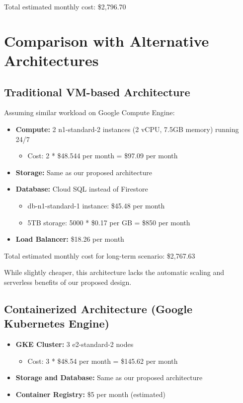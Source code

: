 \documentclass[a4paper, 12pt]{report}
\begin{document}
Total estimated monthly cost: \$2,796.70

\section{Comparison with Alternative Architectures}

\subsection{Traditional VM-based Architecture}

Assuming similar workload on Google Compute Engine:

\begin{itemize}
    \item \textbf{Compute:} 2 n1-standard-2 instances (2 vCPU, 7.5GB memory) running 24/7
        \begin{itemize}
            \item Cost: 2 * \$48.544 per month = \$97.09 per month
        \end{itemize}
    \item \textbf{Storage:} Same as our proposed architecture
    \item \textbf{Database:} Cloud SQL instead of Firestore
        \begin{itemize}
            \item db-n1-standard-1 instance: \$45.48 per month
            \item 5TB storage: 5000 * \$0.17 per GB = \$850 per month
        \end{itemize}
    \item \textbf{Load Balancer:} \$18.26 per month
\end{itemize}

Total estimated monthly cost for long-term scenario: \$2,767.63

While slightly cheaper, this architecture lacks the automatic scaling and serverless benefits of our proposed design.

\subsection{Containerized Architecture (Google Kubernetes Engine)}

\begin{itemize}
    \item \textbf{GKE Cluster:} 3 e2-standard-2 nodes
        \begin{itemize}
            \item Cost: 3 * \$48.54 per month = \$145.62 per month
        \end{itemize}
    \item \textbf{Storage and Database:} Same as our proposed architecture
    \item \textbf{Container Registry:} \$5 per month (estimated)
\end{itemize}
\end{document}
